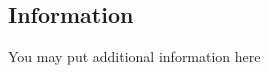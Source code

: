 \documentclass[a4paper,10pt]{article}
\begin{document}
\nocite{*} %
\printbibliography

\newpage

\begin{appendices}
    \section{Information}
    You may put additional information here
\end{appendices}
\end{document}
